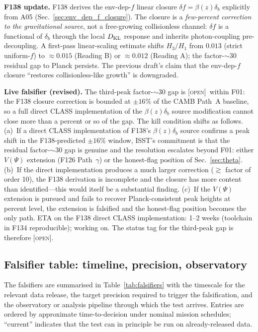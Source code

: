 \documentclass[aps,prd,twocolumn,nofootinbib,floatfix,superscriptaddress]{revtex4-2}
\newcommand{\OPEN}{{\color{black!60!red}\textsc{[open]}}}
\newcommand{\dKL}{D_{\rm KL}}
\begin{document}
\begin{itemize}
\textbf{F138 update.} F138 derives the env-dep-$f$ linear closure
$\delta f = \beta(z)\delta_b$ explicitly from A05
(Sec.~\ref{sec:env_dep_f_closure}). The closure is a \emph{few-percent
correction to the gravitational source}, not a free-growing
collisionless channel: $\delta f$ is a functional of $\delta_b$
through the local $\dKL$ response and inherits photon-coupling
pre-decoupling. A first-pass linear-scaling estimate shifts $H_3/H_1$
from $0.013$ (strict uniform-$f$) to $\approx 0.015$ (Reading B) or
$\approx 0.012$ (Reading A); the factor-$\sim$30 residual gap to Planck
persists. The previous draft's claim that the env-dep-$f$ closure
``restores collisionless-like growth'' is downgraded.

\textbf{Live falsifier (revised).} The third-peak factor-$\sim$30
gap is \OPEN\ within F01: the F138 closure correction is bounded at
$\pm 16\%$ of the CAMB Path~A baseline, so a full direct CLASS
implementation of the $\beta(z)\delta_b$ source modification cannot
close more than a percent or so of the gap. The kill condition
shifts as follows. (a)~If a direct CLASS implementation of F138's
$\beta(z)\delta_b$ source confirms a peak shift in the F138-predicted
$\pm 16\%$ window, ISST's commitment is that the residual factor-$\sim$30
gap is genuine and the resolution escalates beyond F01: either
$V(\Psi)$ extension (F126 Path~$\gamma$) or the honest-flag position
of Sec.~\ref{sec:theta}. (b)~If the direct implementation produces
a much larger correction ($\gtrsim$ factor of order 10), the F138
derivation is incomplete and the closure has more content than
identified---this would itself be a substantial finding. (c)~If the
$V(\Psi)$ extension is pursued and fails to recover Planck-consistent
peak heights at percent level, the extension is falsified and the
honest-flag position becomes the only path. ETA on the F138 direct
CLASS implementation: 1--2 weeks (toolchain in F134 reproducible);
working on. The status tag for the third-peak gap is therefore
\OPEN.
\end{itemize}

\subsection{Falsifier table: timeline, precision, observatory}
\label{sec:falsifier_table}

The falsifiers are summarised in Table~\ref{tab:falsifiers} with
the timescale for the relevant data release, the target precision
required to trigger the falsification, and the observatory or
analysis pipeline through which the test arrives. Entries are
ordered by approximate time-to-decision under nominal mission
schedules; ``current'' indicates that the test can in principle be
run on already-released data.
\end{document}
